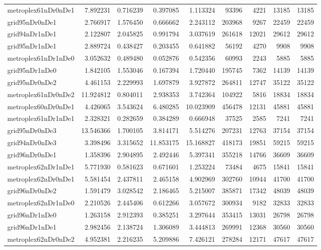 \begin{longtable}{|l|r|r|r|r|r|r|r|r|}
metroplex61nDr0nDe1 & 7.892231 & 0.716239 & 0.397085 & 1.113324 & 93396 & 4221 & 13185 & 13185 \\
grid95nDr0nDe1 & 2.766917 & 1.576450 & 0.666662 & 2.243112 & 203968 & 9267 & 22459 & 22459 \\
grid94nDr1nDe1 & 2.122807 & 2.045825 & 0.991794 & 3.037619 & 261618 & 12021 & 29612 & 29612 \\
grid95nDr1nDe1 & 2.889724 & 0.438427 & 0.203455 & 0.641882 & 56192 & 4270 & 9908 & 9908 \\
metroplex61nDr1nDe0 & 3.052632 & 0.489480 & 0.052876 & 0.542356 & 60993 & 2243 & 5885 & 5885 \\
grid95nDr1nDe0 & 1.842105 & 1.553046 & 0.167394 & 1.720440 & 195745 & 7362 & 14139 & 14139 \\
grid95nDr0nDe2 & 4.461153 & 2.229993 & 1.697879 & 3.927872 & 264811 & 12747 & 35122 & 35122 \\
metroplex61nDr0nDe2 & 11.924812 & 0.804011 & 2.938353 & 3.742364 & 104922 & 5816 & 18834 & 18834 \\
metroplex60nDr0nDe1 & 4.426065 & 3.543624 & 6.480285 & 10.023909 & 456478 & 12131 & 45881 & 45881 \\
metroplex61nDr1nDe1 & 2.328321 & 0.282659 & 0.384289 & 0.666948 & 37525 & 2585 & 7241 & 7241 \\
grid95nDr0nDe3 & 13.546366 & 1.700105 & 3.814171 & 5.514276 & 207231 & 12763 & 37154 & 37154 \\
grid94nDr0nDe3 & 3.398496 & 3.315652 & 11.853175 & 15.168827 & 418173 & 19851 & 59215 & 59215 \\
grid96nDr0nDe1 & 1.358396 & 2.904895 & 2.492446 & 5.397341 & 355218 & 14766 & 36609 & 36609 \\
metroplex62nDr1nDe1 & 5.771930 & 0.581623 & 0.671601 & 1.253224 & 73484 & 4675 & 15841 & 15841 \\
metroplex62nDr0nDe1 & 5.581454 & 2.437811 & 2.465158 & 4.902969 & 302760 & 10944 & 41700 & 41700 \\
grid96nDr0nDe2 & 1.591479 & 3.028542 & 2.186465 & 5.215007 & 385871 & 17342 & 48039 & 48039 \\
metroplex62nDr1nDe0 & 2.210526 & 2.445406 & 0.612266 & 3.057672 & 300934 & 9182 & 32833 & 32833 \\
grid96nDr1nDe0 & 1.263158 & 2.912393 & 0.385251 & 3.297644 & 353415 & 13031 & 26798 & 26798 \\
grid96nDr1nDe1 & 2.982456 & 2.138724 & 1.306089 & 3.444813 & 269991 & 12368 & 30560 & 30560 \\
metroplex62nDr0nDe2 & 4.952381 & 2.216235 & 5.209886 & 7.426121 & 278284 & 12171 & 47617 & 47617 \\

\end{longtable}
